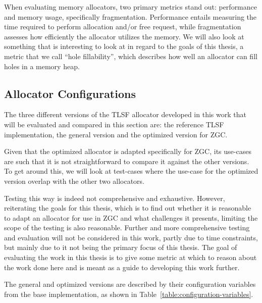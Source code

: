 
When evaluating memory allocators, two primary metrics stand out: performance and memory usage, specifically fragmentation. Performance entails measuring the time required to perform allocation and/or free request, while fragmentation assesses how efficiently the allocator utilizes the memory. We will also look at something that is interesting to look at in regard to the goals of this thesis, a metric that we call ``hole fillability'', which describes how well an allocator can fill holes in a memory heap.

\subsection{Allocator Configurations}



The three different versions of the TLSF allocator developed in this work that will be evaluated and compared in this section are: the reference TLSF implementation, the general version and the optimized version for ZGC. 

Given that the optimized allocator is adapted specifically for ZGC, its use-cases are such that it is not straightforward to compare it against the other versions. To get around this, we will look at test-cases where the use-case for the optimized version overlap with the other two allocators. 

Testing this way is indeed not comprehensive and exhaustive. However, reiterating the goals for this thesis, which is to find out whether it is reasonable to adapt an allocator for use in ZGC and what challenges it presents, limiting the scope of the testing is also reasonable. Further and more comprehensive testing and evaluation will not be considered in this work, partly due to time constraints, but mainly due to it not being the primary focus of this thesis. The goal of evaluating the work in this thesis is to give some metric at which to reason about the work done here and is meant as a guide to developing this work further.

The general and optimized versions are described by their configuration variables from the base implementation, as shown in Table~\ref{table:configuration-variables}.

